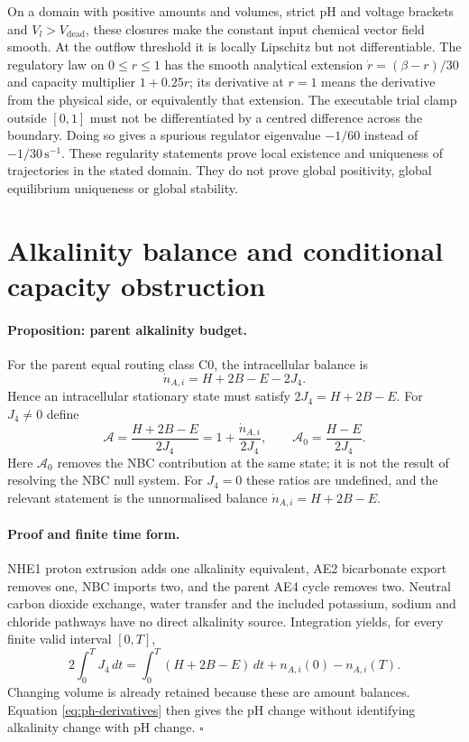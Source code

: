 On a domain with positive amounts and volumes, strict pH and voltage
brackets and $V_l>V_{\mathrm{dead}}$, these closures make the constant input
chemical vector field smooth.  At the outflow threshold it is locally
Lipschitz but not differentiable.  The regulatory law on $0\leq r\leq1$
has the smooth analytical extension $\dot r=(\beta-r)/30$ and
capacity multiplier $1+0.25r$; its derivative at $r=1$ means the derivative
from the physical side, or equivalently that extension.  The executable
trial clamp outside $[0,1]$ must not be differentiated by a centred
difference across the boundary.  Doing so gives a spurious regulator
eigenvalue $-1/60$ instead of $-1/30\,\mathrm{s}^{-1}$.
These regularity statements prove local existence and uniqueness of
trajectories in the stated domain.  They do not prove global positivity,
global equilibrium uniqueness or global stability.

\section{Alkalinity balance and conditional capacity obstruction}
\label{sec:alkalinity-proof}
\paragraph{Proposition: parent alkalinity budget.}
For the parent equal routing class C0, the intracellular balance is
\begin{equation}
 \dot n_{A,i}=H+2B-E-2J_4.
 \label{eq:alkalinity-budget}
\end{equation}
Hence an intracellular stationary state must satisfy
$2J_4=H+2B-E$.  For $J_4\ne0$ define
\[
 \mathcal A=\frac{H+2B-E}{2J_4}
       =1+\frac{\dot n_{A,i}}{2J_4},\qquad
 \mathcal A_0=\frac{H-E}{2J_4}.
\]
Here $\mathcal A_0$ removes the NBC contribution at the same state; it is
not the result of resolving the NBC null system.  For $J_4=0$ these ratios
are undefined, and the relevant statement is the unnormalised balance
$\dot n_{A,i}=H+2B-E$.

\paragraph{Proof and finite time form.}
NHE1 proton extrusion adds one alkalinity equivalent, AE2 bicarbonate
export removes one, NBC imports two, and the parent AE4 cycle removes two.
Neutral carbon dioxide exchange, water transfer and the included potassium,
sodium and chloride pathways have no direct alkalinity source.
Integration yields, for every finite valid interval $[0,T]$,
\begin{equation}
 2\int_0^T J_4\,dt=\int_0^T(H+2B-E)\,dt
                         +n_{A,i}(0)-n_{A,i}(T).
 \label{eq:alkalinity-integrated}
\end{equation}
Changing volume is already retained because these are amount balances.
Equation \eqref{eq:ph-derivatives} then gives the pH change without
identifying alkalinity change with pH change. $\square$

